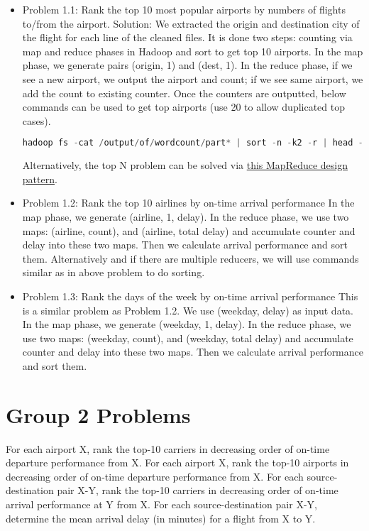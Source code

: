 \documentclass[fontsize=11pt,paper=a4,pagesize=auto]{report}
\begin{document}
\begin{itemize} 
\item Problem 1.1: Rank the top 10 most popular airports by numbers of flights to/from the airport.
Solution: We extracted the origin and destination city of the flight for each line of the cleaned files. It is done two steps: counting via map and reduce phases in Hadoop and sort to get top 10 airports. In the map phase, we generate pairs (origin, 1) and (dest, 1). In the reduce phase, if we see a new airport, we output the airport and count; if we see same airport, we add the count to existing counter. Once the counters are outputted, below commands can be used to get top airports (use 20 to allow duplicated top cases). 
\begin{lstlisting}[language = C++]
hadoop fs -cat /output/of/wordcount/part* | sort -n -k2 -r | head -n20
\end{lstlisting}
Alternatively, the top N problem can be solved via \href{https://github.com/adamjshook/mapreducepatterns/blob/master/MRDP/src/main/java/mrdp/ch3/TopTenDriver.java}{this MapReduce design pattern}. 

\item Problem 1.2: Rank the top 10 airlines by on-time arrival performance
In the map phase, we generate (airline, 1, delay). In the reduce phase, we use two maps: (airline, count), and (airline, total delay) and accumulate counter and delay into these two maps. Then we calculate arrival performance and sort them. Alternatively and if there are multiple reducers, we will use commands similar as in above problem to do sorting. 

\item Problem 1.3: Rank the days of the week by on-time arrival performance
This is a similar problem as Problem 1.2. We use (weekday, delay) as input data. In the map phase, we generate (weekday, 1, delay). In the reduce phase, we use two maps: (weekday, count), and (weekday, total delay) and accumulate counter and delay into these two maps. Then we calculate arrival performance and sort them.   

\end{itemize}
 
\section{Group 2 Problems}
 
 For each airport X, rank the top-10 carriers in decreasing order of on-time departure performance from X.
For each airport X, rank the top-10 airports in decreasing order of on-time departure performance from X.
For each source-destination pair X-Y, rank the top-10 carriers in decreasing order of on-time arrival performance at Y from X.
For each source-destination pair X-Y, determine the mean arrival delay (in minutes) for a flight from X to Y.
\end{document}
